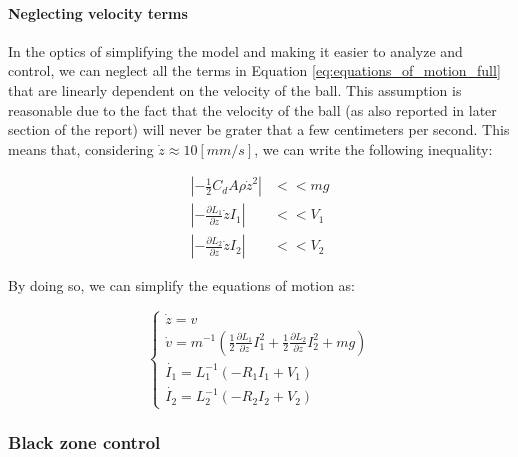 \paragraph{Neglecting velocity terms}

In the optics of simplifying the model and making it easier to analyze and control, we can neglect all the terms in Equation \ref{eq:equations_of_motion_full} that are linearly dependent on the velocity of the ball.
This assumption is reasonable due to the fact that the velocity of the ball (as also reported in later section of the report) will never be grater that a few centimeters per second.
This means that, considering $\dot{z} \approx 10 [mm/s]$, we can write the following inequality:

\begin{equation}
    \begin{aligned}
        \left| -\frac{1}{2} C_d A \rho \dot{z}^2 \right|            & << m g \\
        \left| -\frac{\partial L_1}{\partial z} \dot{z} I_1 \right| & << V_1 \\
        \left| -\frac{\partial L_2}{\partial z} \dot{z} I_2 \right| & << V_2
    \end{aligned}
\end{equation}

By doing so, we can simplify the equations of motion as:

\begin{equation}
    \begin{cases}
        \dot{z} = v                                                                                                                                 \\
        \dot{v} = m^{-1} \left(\frac{1}{2} \frac{\partial L_1}{\partial z} I_1^2 + \frac{1}{2} \frac{\partial L_2}{\partial z} I_2^2 + m g  \right) \\
        \dot{I_1} = L_1^{-1} \left(- R_1 I_1 + V_1 \right)                                                                                          \\
        \dot{I_2} = L_2^{-1} \left(- R_2 I_2 + V_2 \right)
    \end{cases}
    \label{eq:reduced_equations_of_motion}
\end{equation}


\subsubsection{Black zone control}
\label{subsubsec:black_zone_control}

